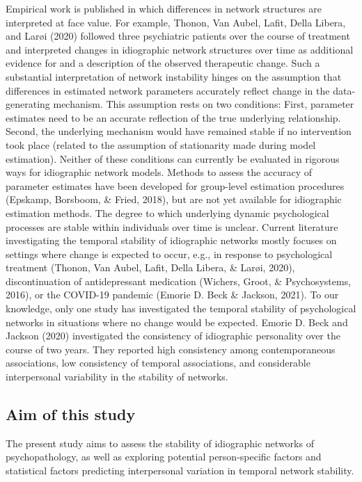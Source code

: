 \documentclass[
  english,
  man]{apa6}
\begin{document}
Empirical work is published in which differences in network structures are interpreted at face value. For example, Thonon, Van Aubel, Lafit, Della Libera, and Larøi (2020) followed three psychiatric patients over the course of treatment and interpreted changes in idiographic network structures over time as additional evidence for and a description of the observed therapeutic change. Such a substantial interpretation of network instability hinges on the assumption that differences in estimated network parameters accurately reflect change in the data-generating mechanism. This assumption rests on two conditions: First, parameter estimates need to be an accurate reflection of the true underlying relationship. Second, the underlying mechanism would have remained stable if no intervention took place (related to the assumption of stationarity made during model estimation). Neither of these conditions can currently be evaluated in rigorous ways for idiographic network models. Methods to assess the accuracy of parameter estimates have been developed for group-level estimation procedures (Epskamp, Borsboom, \& Fried, 2018), but are not yet available for idiographic estimation methods. The degree to which underlying dynamic psychological processes are stable within individuals over time is unclear. Current literature investigating the temporal stability of idiographic networks mostly focuses on settings where change is expected to occur, e.g., in response to psychological treatment (Thonon, Van Aubel, Lafit, Della Libera, \& Larøi, 2020), discontinuation of antidepressant medication (Wichers, Groot, \& Psychosystems, 2016), or the COVID-19 pandemic (Emorie D. Beck \& Jackson, 2021). To our knowledge, only one study has investigated the temporal stability of psychological networks in situations where no change would be expected. Emorie D. Beck and Jackson (2020) investigated the consistency of idiographic personality over the course of two years. They reported high consistency among contemporaneous associations, low consistency of temporal associations, and considerable interpersonal variability in the stability of networks.

\hypertarget{aim-of-this-study}{%
\subsection{Aim of this study}\label{aim-of-this-study}}

The present study aims to assess the stability of idiographic networks of psychopathology, as well as exploring potential person-specific factors and statistical factors predicting interpersonal variation in temporal network stability.
\end{document}
